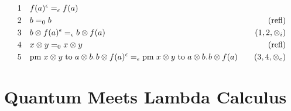 \begin{equation*}
  \begin{split}
  1 \hspace{10 pt} & f(a)^{\epsilon} =_{\epsilon} f(a) \\
  2 \hspace{10 pt} &  b =_{0} b & {(\text{refl})} \\
  3 \hspace{10 pt} & b \otimes f(a)^{\epsilon}  =_{\epsilon} b \otimes f(a)  & \text{($1,2,\otimes_i$)} \\
  4 \hspace{10 pt} &   x \otimes y =_{0}  x \otimes y  &{(\text{refl})}  \\
  5\hspace{10 pt}& \text{pm} \hspace{3 pt} x \otimes y\hspace{3 pt} \text{to} \hspace{3 pt} a \otimes b. \hspace{1pt} b \otimes f(a)^{\epsilon} =_{\epsilon} \text{pm} \hspace{3 pt} x \otimes y\hspace{3 pt} \text{to} \hspace{3 pt} a \otimes b. \hspace{1pt} b \otimes f(a) & \hspace{10pt} \text{($3,4,\otimes_e$)}
  \end{split}
  \end{equation*}



































\chapter{Quantum Meets Lambda Calculus} \label{sec:Quantum Lambda Calculus}

